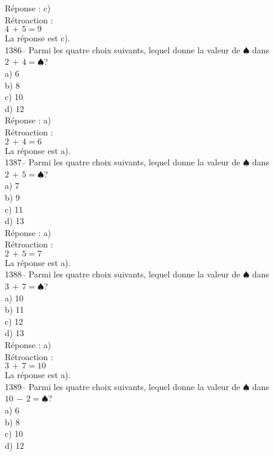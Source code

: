 ﻿\documentclass[letterpaper, 12pt]{article}
\begin{document}
R\'eponse : c)\\

R\'etroaction : \\
$4\,+\,5=9$\\
La r\'eponse est c).\\

1386-- Parmi les quatre choix suivants, lequel donne la valeur de
$\spadesuit$ dans $2\,+\,4=\spadesuit$?\\
a) 6\\
b) 8\\
c) 10\\
d) 12\\

R\'eponse : a)\\

R\'etroaction : \\
$2\,+\,4=6$\\
La r\'eponse est a).\\

1387-- Parmi les quatre choix suivants, lequel donne la valeur de
$\spadesuit$ dans $2\,+\,5=\spadesuit$?\\
a) 7\\
b) 9\\
c) 11\\
d) 13\\

R\'eponse : a)\\

R\'etroaction : \\
$2\,+\,5=7$\\
La r\'eponse est a).\\

1388-- Parmi les quatre choix suivants, lequel donne la valeur de
$\spadesuit$ dans $3\,+\,7=\spadesuit$?\\
a) 10\\
b) 11\\
c) 12\\
d) 13\\

R\'eponse : a)\\

R\'etroaction : \\
$3\,+\,7=10$\\
La r\'eponse est a).\\

1389-- Parmi les quatre choix suivants, lequel donne la valeur de
$\spadesuit$ dans $10\,-\,2=\spadesuit$?\\
a) 6\\
b) 8\\
c) 10\\
d) 12\\
\end{document}
